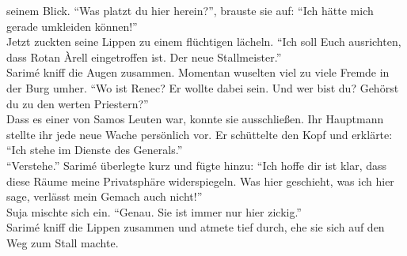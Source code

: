 seinem Blick. ``Was platzt du hier herein?'', brauste sie auf: ``Ich hätte mich gerade umkleiden 
können!''\\
Jetzt zuckten seine Lippen zu einem flüchtigen lächeln. ``Ich soll Euch ausrichten, dass Rotan 
Àrell eingetroffen ist. Der neue Stallmeister.''\\
Sarimé kniff die Augen zusammen. Momentan wuselten viel zu viele Fremde in der Burg umher. ``Wo ist 
Renec? Er wollte dabei sein. Und wer bist du? Gehörst du zu den werten Priestern?''\\
Dass es einer von Samos Leuten war, konnte sie ausschließen. Ihr Hauptmann stellte ihr jede neue 
Wache persönlich vor. Er schüttelte den Kopf und erklärte: ``Ich stehe im Dienste des Generals.''\\
``Verstehe.'' Sarimé überlegte kurz und fügte hinzu: ``Ich hoffe dir ist klar, dass diese Räume 
meine Privatsphäre widerspiegeln. Was hier geschieht, was ich hier sage, verlässt mein Gemach auch 
nicht!''\\
Suja mischte sich ein. ``Genau. Sie ist immer nur hier zickig.''\\
Sarimé kniff die Lippen zusammen und atmete tief durch, ehe sie sich auf den Weg zum Stall machte.\\

